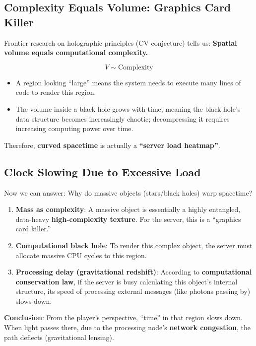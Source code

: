 \subsection{Complexity Equals Volume: Graphics Card Killer}

Frontier research on holographic principles (CV conjecture) tells us: \textbf{Spatial volume equals computational complexity.}

\[
V \sim \text{Complexity}
\]

\begin{itemize}
\item A region looking ``large'' means the system needs to execute many lines of code to render this region.
\item The volume inside a black hole grows with time, meaning the black hole's data structure becomes increasingly chaotic; decompressing it requires increasing computing power over time.
\end{itemize}

Therefore, \textbf{curved spacetime} is actually a \textbf{``server load heatmap''}.

\subsection{Clock Slowing Due to Excessive Load}

Now we can answer: Why do massive objects (stars/black holes) warp spacetime?

\begin{enumerate}
\item \textbf{Mass as complexity}: A massive object is essentially a highly entangled, data-heavy \textbf{high-complexity texture}. For the server, this is a ``graphics card killer.''
\item \textbf{Computational black hole}: To render this complex object, the server must allocate massive CPU cycles to this region.
\item \textbf{Processing delay (gravitational redshift)}: According to \textbf{computational conservation law}, if the server is busy calculating this object's internal structure, its speed of processing external messages (like photons passing by) slows down.
\end{enumerate}

\textbf{Conclusion}: From the player's perspective, ``time'' in that region slows down. When light passes there, due to the processing node's \textbf{network congestion}, the path deflects (gravitational lensing).


